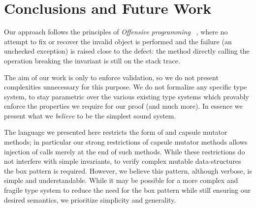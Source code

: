 \section{Conclusions and Future Work}


Our approach follows the principles of \emph{Offensive programming}
~\cite{stephens2015beginning}, where 
no attempt to fix or recover the invalid object is performed and
 the failure (an unchecked exception)
		is raised close to the defect:
    the method directly calling the operation breaking the invariant is still on the stack trace.


The aim of our work is only to enforce validation, so we do not present complexities unnecessary for this purpose. We do not formalize any specific type system, to stay parametric over 
the various existing type systems which provably enforce the properties we require for our proof (and much more).
In essence we present what we \emph{believe} to be the simplest sound system.






The language we presented here restricts the form of \validate
and capsule mutator methods; in particular
our strong restrictions of capsule mutator methods
allows injection of \validate{} calls merely at the end of such methods.
While these restrictions do not interfere with simple
invariants, to verify complex mutable data-structures the box pattern is required.
However, we believe this pattern, although verbose, is simple and understandable. While it may be possible for a more
complex and fragile type system to reduce the need for the box pattern
 while still ensuring our desired semantics, we prioritize simplicity and generality.


